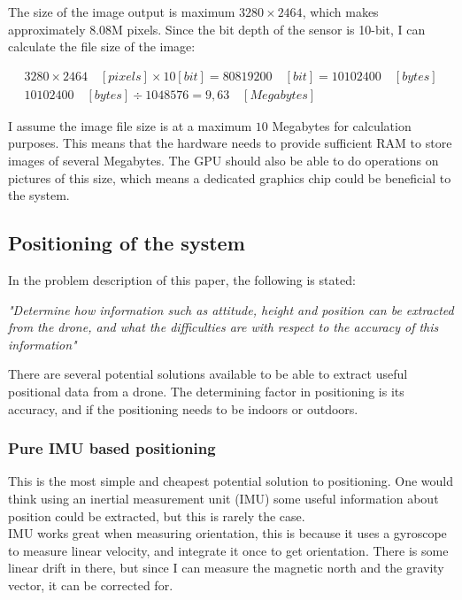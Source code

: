 The size of the image output is maximum $3280 \times 2464 $, which makes approximately 8.08M pixels. Since the bit depth of the sensor is 10-bit, I can calculate the file size of the image:

\begin{align*}
3280\times 2464 \quad[pixels] \times 10[bit] = 80819200\quad[bit] = 10102400\quad[bytes]\\
10102400\quad[bytes] \div1048576 = 9,63\quad[Megabytes]
\end{align*}

I assume the image file size is at a maximum $10$ Megabytes for calculation purposes. This means that the hardware needs to provide sufficient RAM to store images of several Megabytes. The GPU should also be able to do operations on pictures of this size, which means a dedicated graphics chip could be beneficial to the system.


\newpage
\subsection{Positioning of the system}
In the problem description of this paper, the following is stated:
\begin{center}
\emph{"Determine how information such as attitude, height and position can be extracted from the drone, and what the difficulties are with respect to the accuracy of this information"}
\end{center}

There are several potential solutions available to be able to extract useful positional data from a drone. The determining factor in positioning is its accuracy, and if the positioning needs to be indoors or outdoors. 

\subsubsection{Pure IMU based positioning}
This is the most simple and cheapest potential solution to positioning. One would think using an inertial measurement unit (IMU) some useful information about position could be extracted, but this is rarely the case.\\

IMU works great when measuring orientation, this is because it uses a gyroscope to measure linear velocity, and integrate it once to get orientation. There is some linear drift in there, but since I can measure the magnetic north and the gravity vector, it can be corrected for.\\

